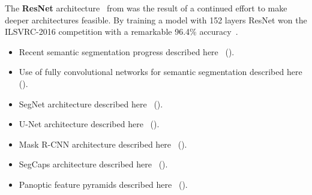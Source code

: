 The \textbf{ResNet} architecture~\cite{resnet} from \citeyear{resnet} was the result of a continued effort to make deeper architectures feasible.
By training a model with 152 layers ResNet won the ILSVRC-2016 competition with a remarkable 96.4\% accuracy~\cite{segmentation-overview}.

\begin{itemize}
  \item Recent semantic segmentation progress described here~\cite{segmentation-progress} (\citeyear{segmentation-progress}).
  \item Use of fully convolutional networks for semantic segmentation described here~\cite{segmentation-fcnn} (\citeyear{segmentation-fcnn}).
  \item SegNet architecture described here~\cite{segmentation-segnet} (\citeyear{segmentation-segnet}).
  \item U-Net architecture described here~\cite{segmentation-unet} (\citeyear{segmentation-unet}).
  \item Mask R-CNN architecture described here~\cite{segmentation-mask-r-cnn} (\citeyear{segmentation-mask-r-cnn}).
  \item SegCaps architecture described here~\cite{segmentation-segcaps} (\citeyear{segmentation-segcaps}).
  \item Panoptic feature pyramids described here~\cite{segmentation-panoptic-feature-pyramid} (\citeyear{segmentation-panoptic-feature-pyramid}).
\end{itemize}
